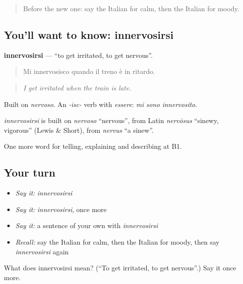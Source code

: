 \begin{quote}
Before the new one: say the Italian for calm, then the Italian for moody.
\end{quote}

\subsection*{You'll want to know: innervosirsi}
\textbf{innervosirsi} — \textquotedblleft{}to get irritated, to get nervous\textquotedblright{}.

\begin{quote}
Mi innervosisco quando il treno è in ritardo.
\end{quote}

\begin{quote}
\emph{I get irritated when the train is late.}
\end{quote}

Built on \emph{nervoso}. An \emph{-isc-} verb with \emph{essere}: \emph{mi sono innervosito}.

\begin{cousinweb}
\emph{innervosirsi} is built on \emph{nervoso} \textquotedblleft{}nervous\textquotedblright{}, from Latin \emph{nervōsus} \textquotedblleft{}sinewy, vigorous\textquotedblright{} (Lewis \& Short), from \emph{nervus} \textquotedblleft{}a sinew\textquotedblright{}.
\end{cousinweb}

\begin{grammarlens}[title={What you've built}]
One more word for telling, explaining and describing at B1.
\end{grammarlens}

\subsection*{Your turn}
\begin{itemize}
\raggedright
  \item \emph{Say it:} \emph{innervosirsi}
  \item \emph{Say it:} \emph{innervosirsi}, once more
  \item \emph{Say it:} a sentence of your own with \emph{innervosirsi}
  \item \emph{Recall:} say the Italian for calm, then the Italian for moody, then say \emph{innervosirsi} again
\end{itemize}

\begin{tcolorbox}[breakable,colback=teal!4,colframe=teal!35!black,title={Before you move on}]
What does innervosirsi mean? (\textquotedblleft{}To get irritated, to get nervous\textquotedblright{}.) Say it once more.
\end{tcolorbox}
